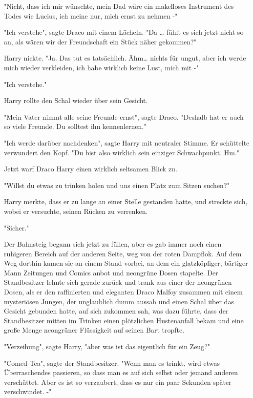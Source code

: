 {"Nicht, dass ich mir wünschte, mein Dad wäre ein makelloses Instrument des Todes wie Lucius, ich meine nur, mich ernst zu nehmen -"

"Ich verstehe", sagte Draco mit einem Lächeln. "Da … fühlt es sich jetzt nicht so an, als wären wir der Freundschaft ein Stück näher gekommen?"

Harry nickte. "Ja. Das tut es tatsächlich. Ähm… nichts für ungut, aber ich werde mich wieder verkleiden, ich habe wirklich keine Lust, mich mit -"

"Ich verstehe."

Harry rollte den Schal wieder über sein Gesicht.

"Mein Vater nimmt alle seine Freunde ernst", sagte Draco. "Deshalb hat er auch so viele Freunde. Du solltest ihn kennenlernen."

"Ich werde darüber nachdenken", sagte Harry mit neutraler Stimme. Er schüttelte verwundert den Kopf. "Du bist also wirklich sein einziger Schwachpunkt. Hm."

Jetzt warf Draco Harry einen wirklich seltsamen Blick zu.

"Willst du etwas zu trinken holen und uns einen Platz zum Sitzen suchen?"

Harry merkte, dass er zu lange an einer Stelle gestanden hatte, und streckte sich, wobei er versuchte, seinen Rücken zu verrenken.

"Sicher."

Der Bahnsteig begann sich jetzt zu füllen, aber es gab immer noch einen ruhigeren Bereich auf der anderen Seite, weg von der roten Dampflok. Auf dem Weg dorthin kamen sie an einem Stand vorbei, an dem ein glatzköpfiger, bärtiger Mann Zeitungen und Comics anbot und neongrüne Dosen stapelte. Der Standbesitzer lehnte sich gerade zurück und trank aus einer der neongrünen Dosen, als er den raffinierten und eleganten Draco Malfoy zusammen mit einem mysteriösen Jungen, der unglaublich dumm aussah und einen Schal über das Gesicht gebunden hatte, auf sich zukommen sah, was dazu führte, dass der Standbesitzer mitten im Trinken einen plötzlichen Hustenanfall bekam und eine große Menge neongrüner Flüssigkeit auf seinen Bart tropfte.

"Verzeihung", sagte Harry, "aber was ist das eigentlich für ein Zeug?"

"Comed-Tea", sagte der Standbesitzer. "Wenn man es trinkt, wird etwas Überraschendes passieren, so dass man es auf sich selbst oder jemand anderen verschüttet. Aber es ist so verzaubert, dass es nur ein paar Sekunden später verschwindet. -"

}
